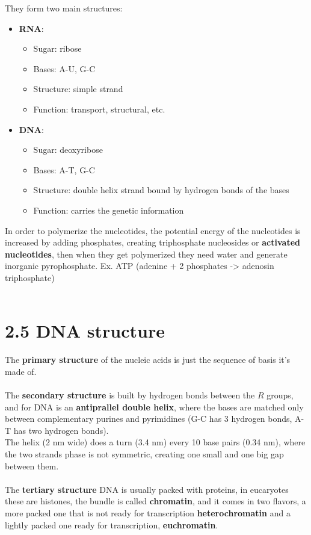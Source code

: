 \documentclass[a4paper,landscape,10pt]{cheatsheet}
\begin{document}
They form two main structures:
\begin{itemize}
  \item \textbf{RNA}:
        \begin{itemize}
          \item Sugar: ribose
          \item Bases: A-U, G-C
          \item Structure: simple strand
          \item Function: transport, structural, etc.
        \end{itemize}
  \item \textbf{DNA}:
        \begin{itemize}
          \item Sugar: deoxyribose
          \item Bases: A-T, G-C
          \item Structure: double helix strand bound by hydrogen bonds of the bases
          \item Function: carries the genetic information
        \end{itemize}
\end{itemize}

In order to polymerize the nucleotides, the potential energy of the nucleotides is increased by adding phosphates,
creating triphosphate nucleosides or \textbf{activated nucleotides}, then when they get polymerized they need water and
generate inorganic pyrophosphate. Ex. ATP (adenine + 2 phosphates -> adenosin triphosphate) \\

\hfil\\
\section*{2.5 DNA structure}
The \textbf{primary structure} of the nucleic acids is just the sequence of basis it's made of.\\
\hfill\\
The \textbf{secondary structure} is built by hydrogen bonds between the $R$ groups, and for DNA is an
\textbf{antiprallel double helix}, where the bases are matched only between complementary purines and pyrimidines (G-C
has 3 hydrogen bonds, A-T has two hydrogen bonds).\\
The helix (2 nm wide) does a turn (3.4 nm) every 10 base pairs (0.34 nm), where the two strands phase is not symmetric,
creating one small and one big gap between them.\\
\hfill\\
The \textbf{tertiary structure} DNA is usually packed with proteins, in eucaryotes these are histones, the bundle is
called \textbf{chromatin}, and it comes in two flavors, a more packed one that is not ready for transcription
\textbf{heterochromatin} and a lightly packed one ready for transcription, \textbf{euchromatin}.\\
\end{document}
